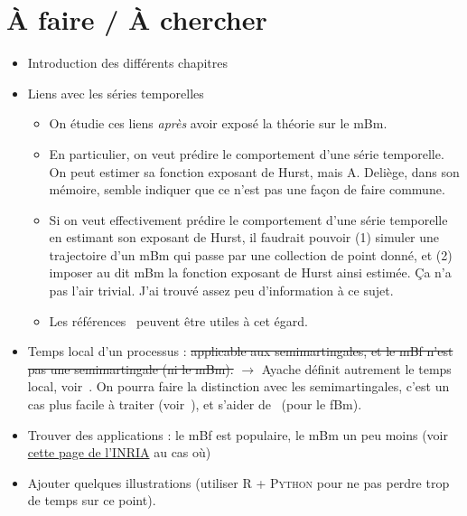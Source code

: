 



\section{À faire / À chercher}
\begin{itemize}
\item Introduction des différents chapitres
\item Liens avec les séries temporelles
  \begin{itemize}
  \item On étudie ces liens \emph{après} avoir exposé la théorie sur
    le mBm.
  \item En particulier, on veut prédire le comportement d'une série
    temporelle. On peut estimer sa fonction exposant de Hurst, mais
    A. Deliège, dans son mémoire, semble indiquer que ce n'est pas une
    façon de faire commune.
  \item Si on veut effectivement prédire le comportement d'une série
    temporelle en estimant son exposant de Hurst, il faudrait pouvoir
    (1) simuler une trajectoire d'un mBm qui passe par une collection
    de point donné, et (2) imposer au dit mBm la fonction exposant de
    Hurst ainsi estimée. Ça n'a pas l'air trivial. J'ai trouvé assez
    peu d'information à ce sujet.
  \item Les références~\cite{garcin2016, garcin2021} peuvent être
    utiles à cet égard.
  \end{itemize}
\item Temps local d'un processus : \st{applicable aux semimartingales,
    et le mBf n'est pas une semimartingale (ni le mBm).}
  $\longrightarrow$ Ayache définit autrement le temps local,
  voir~\cite[Sec.~2.2]{ayache2018}. On pourra faire la distinction
  avec les semimartingales, c'est un cas plus facile à traiter
  (voir~\cite[p.~13-14]{yen2013}), et s'aider
  de~\cite[Sec.~10.1]{biagini2008} (pour le fBm).
\item Trouver des applications : le mBf est populaire, le mBm un peu
  moins (voir
  \href{https://team.inria.fr/anja/english-theoretical-aspects/multifractional-brownian-motion/multifractional-brownian-motion-bibliography/}{cette page de l'INRIA}
  au cas où)
\item Ajouter quelques illustrations (utiliser \textsc{R} +
  \textsc{Python} pour ne pas perdre trop de temps sur ce point).
\end{itemize}